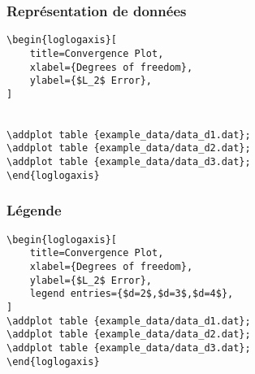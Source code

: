 \documentclass{clic_latex_beamer}
\begin{document}
\begin{frame}[fragile]
\frametitle{Représentation de données}
\begin{multicols}{2}

\columnbreak

\begin{lstlisting}
\begin{loglogaxis}[
    title=Convergence Plot,
    xlabel={Degrees of freedom},
    ylabel={$L_2$ Error},
]


\addplot table {example_data/data_d1.dat};
\addplot table {example_data/data_d2.dat};
\addplot table {example_data/data_d3.dat};
\end{loglogaxis}
\end{lstlisting}

\end{multicols}

\end{frame}

\begin{frame}[fragile]
\frametitle{Légende}
\begin{multicols}{2}

\columnbreak

\begin{lstlisting}
\begin{loglogaxis}[
    title=Convergence Plot,
    xlabel={Degrees of freedom},
    ylabel={$L_2$ Error},
    legend entries={$d=2$,$d=3$,$d=4$},
]
\addplot table {example_data/data_d1.dat};
\addplot table {example_data/data_d2.dat};
\addplot table {example_data/data_d3.dat};
\end{loglogaxis}
\end{lstlisting}

\end{multicols}

\end{frame}
\end{document}
